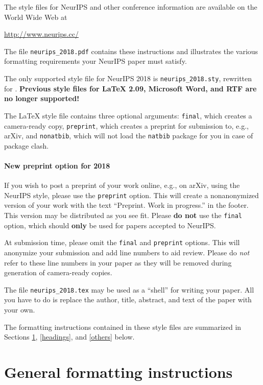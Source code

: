 \documentclass{article}
\begin{document}
The style files for NeurIPS and other conference information are available on
the World Wide Web at
\begin{center}
  \url{http://www.neurips.cc/}
\end{center}
The file \verb+neurips_2018.pdf+ contains these instructions and illustrates the
various formatting requirements your NeurIPS paper must satisfy.

The only supported style file for NeurIPS 2018 is \verb+neurips_2018.sty+,
rewritten for \LaTeXe{}.  \textbf{Previous style files for \LaTeX{} 2.09,
  Microsoft Word, and RTF are no longer supported!}

The \LaTeX{} style file contains three optional arguments: \verb+final+, which
creates a camera-ready copy, \verb+preprint+, which creates a preprint for
submission to, e.g., arXiv, and \verb+nonatbib+, which will not load the
\verb+natbib+ package for you in case of package clash.

\paragraph{New preprint option for 2018}
If you wish to post a preprint of your work online, e.g., on arXiv, using the
NeurIPS style, please use the \verb+preprint+ option. This will create a
nonanonymized version of your work with the text ``Preprint. Work in progress.''
in the footer. This version may be distributed as you see fit. Please \textbf{do
  not} use the \verb+final+ option, which should \textbf{only} be used for
papers accepted to NeurIPS.

At submission time, please omit the \verb+final+ and \verb+preprint+
options. This will anonymize your submission and add line numbers to aid
review. Please do \emph{not} refer to these line numbers in your paper as they
will be removed during generation of camera-ready copies.

The file \verb+neurips_2018.tex+ may be used as a ``shell'' for writing your
paper. All you have to do is replace the author, title, abstract, and text of
the paper with your own.

The formatting instructions contained in these style files are summarized in
Sections \ref{gen_inst}, \ref{headings}, and \ref{others} below.

\section{General formatting instructions}
\label{gen_inst}
\end{document}
